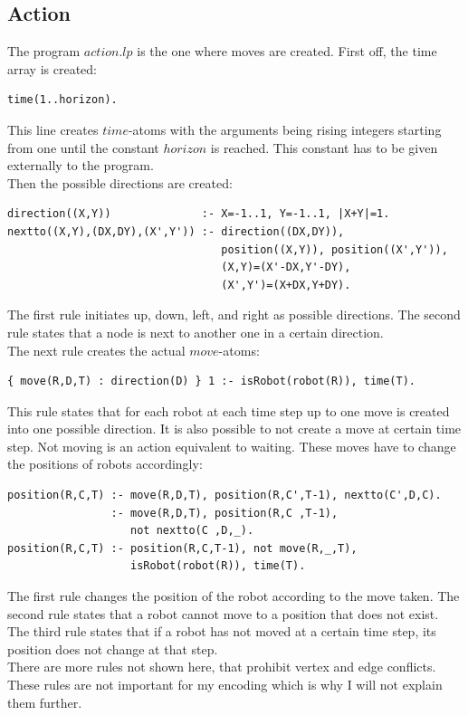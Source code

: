 \documentclass[runningheads]{llncs}
\begin{document}
\subsection{Action}
The program $action.lp$ is the one where moves are created. First off, the time array is created:
\begin{verbatim}
time(1..horizon).
\end{verbatim}
This line creates $time$-atoms with the arguments being rising integers starting from one until the constant $horizon$ is reached. This constant has to be given externally to the program.  \\
Then the possible directions are created:
\begin{verbatim}
direction((X,Y))              :- X=-1..1, Y=-1..1, |X+Y|=1.
nextto((X,Y),(DX,DY),(X',Y')) :- direction((DX,DY)), 
                                 position((X,Y)), position((X',Y')), 
                                 (X,Y)=(X'-DX,Y'-DY), 
                                 (X',Y')=(X+DX,Y+DY).
\end{verbatim}
The first rule initiates up, down, left, and right as possible directions. The second rule states that a node is next to another one in a certain direction. \\
The next rule creates the actual $move$-atoms:
\begin{verbatim}
{ move(R,D,T) : direction(D) } 1 :- isRobot(robot(R)), time(T).
\end{verbatim}
This rule states that for each robot at each time step up to one move is created into one possible direction. It is also possible to not create a move at certain time step. Not moving is an action equivalent to waiting. These moves have to change the positions of robots accordingly:
\begin{verbatim}
position(R,C,T) :- move(R,D,T), position(R,C',T-1), nextto(C',D,C).
                :- move(R,D,T), position(R,C ,T-1), 
                   not nextto(C ,D,_).
position(R,C,T) :- position(R,C,T-1), not move(R,_,T), 
                   isRobot(robot(R)), time(T).
\end{verbatim}
The first rule changes the position of the robot according to the move taken. The second rule states that a robot cannot move to a position that does not exist. The third rule states that if a robot has not moved at a certain time step, its position does not change at that step. \\
There are more rules not shown here, that prohibit vertex and edge conflicts. These rules are not important for my encoding which is why I will not explain them further. 
\end{document}
